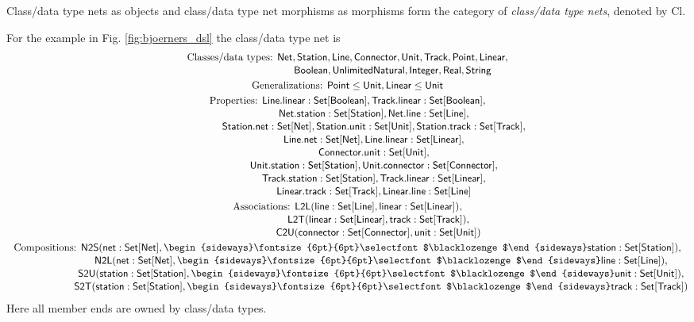 \documentclass[10pt,fleqn,final]{scrreprt}
\newenvironment{definitions}[0]{\medskip }{}
\newcommand{\composition}{\raisebox{0.2pt}{\begin{sideways}\fontsize{6pt}{6pt}\selectfont$\blacklozenge$\end{sideways}}}
\begin{document}
\begin{definitions}
Class/data type nets as objects and class/data type net morphisms as
morphisms form the category of \emph{class/data type nets}, denoted by
$\mathrm{Cl}$.

\medskip
 For the example in Fig. \ref{fig:bjoerners_dsl} the class/data type net is 
%
\begin{gather*}
  \text{Classes/data types: }\mathsf{Net}, \mathsf{Station}, \mathsf{Line}, \mathsf{Connector}, \mathsf{Unit}, \mathsf{Track}, \mathsf{Point}, \mathsf{Linear},
\\[-.5ex]
  \phantom{\text{Classes/data types: }}\mathsf{Boolean}, \mathsf{UnlimitedNatural}, \mathsf{Integer}, \mathsf{Real}, \mathsf{String}
\\
  \text{Generalizations: }\mathsf{Point} \leq \mathsf{Unit}, \mathsf{Linear} \leq \mathsf{Unit}
\\
  \text{Properties: }\mathsf{Line.linear : Set[Boolean]}, \mathsf{Track.linear : Set[Boolean]},
\\[-.5ex]
  \phantom{\text{Properties: }}\mathsf{Net.station : Set[Station]}, \mathsf{Net.line : Set[Line]},
\\[-.5ex]
  \phantom{\text{Properties: }}\mathsf{Station.net : Set[Net]}, \mathsf{Station.unit : Set[Unit]}, \mathsf{Station.track : Set[Track]},
\\[-.5ex]
  \phantom{\text{Properties: }}\mathsf{Line.net : Set[Net]}, \mathsf{Line.linear : Set[Linear]},
\\[-.5ex]
  \phantom{\text{Properties: }}\mathsf{Connector.unit : Set[Unit]},
\\[-.5ex]
  \phantom{\text{Properties: }}\mathsf{Unit.station : Set[Station]}, \mathsf{Unit.connector : Set[Connector]},
\\[-.5ex]
  \phantom{\text{Properties: }}\mathsf{Track.station : Set[Station]}, \mathsf{Track.linear : Set[Linear]},
\\[-.5ex]
  \phantom{\text{Properties: }}\mathsf{Linear.track : Set[Track]}, \mathsf{Linear.line : Set[Line]}
\\
  \text{Associations: }\mathsf{L2L(line : Set[Line], linear : Set[Linear])},
\\[-.5ex]
  \phantom{\text{Associations: }}\mathsf{L2T(linear : Set[Linear], track : Set[Track])},
\\[-.5ex]
  \phantom{\text{Associations: }}\mathsf{C2U(connector : Set[Connector], unit : Set[Unit])}
\\
  \text{Compositions: }\mathsf{N2S(net : Set[Net], \composition station : Set[Station])},
\\[-.5ex]
  \phantom{\text{Compositions: }}\mathsf{N2L(net : Set[Net], \composition line : Set[Line])},
\\[-.5ex]
  \phantom{\text{Compositions: }}\mathsf{S2U(station : Set[Station], \composition unit : Set[Unit])},
\\[-.5ex]
  \phantom{\text{Compositions: }}\mathsf{S2T(station : Set[Station], \composition track : Set[Track])}
\end{gather*}
%
Here all member ends are owned by class/data types.



\end{definitions}
\end{document}
